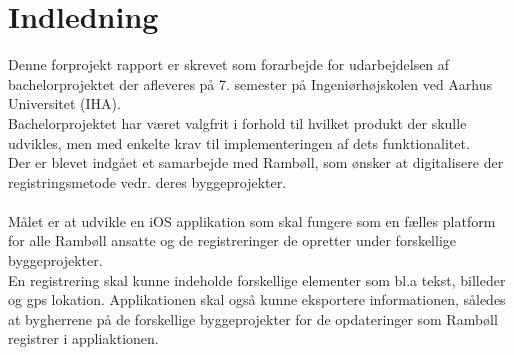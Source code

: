 \chapter{Indledning}
Denne forprojekt rapport er skrevet som forarbejde for udarbejdelsen af bachelorprojektet der afleveres på 7. semester på Ingeniørhøjskolen ved Aarhus Universitet (IHA).\\
Bachelorprojektet har været valgfrit i forhold til hvilket produkt der skulle udvikles, men med
enkelte krav til implementeringen af dets funktionalitet.\\
Der er blevet indgået et samarbejde med Rambøll, som ønsker at digitalisere der registringsmetode vedr. deres byggeprojekter.\\ \\
Målet er at udvikle en iOS applikation som skal fungere som en fælles platform for alle Rambøll ansatte og de registreringer de opretter under forskellige byggeprojekter.\\
En registrering skal kunne indeholde forskellige elementer som bl.a tekst, billeder og gps lokation. \newline
Applikationen skal også kunne eksportere informationen, således at bygherrene på de forskellige byggeprojekter for de opdateringer som Rambøll registrer i appliaktionen.